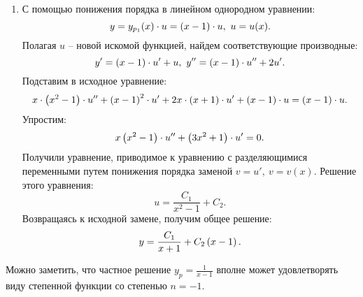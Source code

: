 \begin{enumerate}
\begin{enumerate}
					\item С помощью понижения порядка в линейном однородном уравнении:
						\[ y = y_{p_1}(x) \cdot u = \left( x - 1 \right) \cdot u, ~ u = u(x). \]
						Полагая $u$ -- новой искомой функцией, найдем соответствующие производные:
						\[ y' = \left( x - 1 \right) \cdot u' + u, ~ y'' = \left( x - 1 \right) \cdot u'' + 2u'. \]
						Подставим в исходное уравнение:
						\[ x \cdot \left( x^2 - 1 \right) \cdot u'' + \left( x - 1 \right)^2 \cdot u' + 2 x \cdot \left( x + 1 \right) \cdot u' + \left( x - 1 \right) \cdot u = \left( x - 1 \right) \cdot u. \]
						Упростим:
						\[ x \left( x^2 - 1 \right) \cdot u'' + \left( 3x^2 + 1 \right) \cdot u' = 0. \]
						Получили уравнение, приводимое к уравнению с разделяющимися переменными путем понижения порядка заменой $v = u', ~ v = v(x)$. Решение этого уравнения:
						\[ u = \frac{C_1}{x^2 - 1} + C_2. \]
						Возвращаясь к исходной замене, получим общее решение:
						\[ y = \frac{C_1}{x + 1} + C_2 \left( x - 1 \right). \] 

				\end{enumerate}
				Можно заметить, что частное решение $y_p = \frac{1}{x - 1}$ вполне может удовлетворять виду степенной функции со степенью $n = -1$.
		

\end{enumerate}
